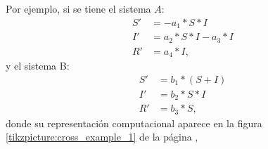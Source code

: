 Por ejemplo, si se tiene el sistema $A$:
\begin{align*}
    S' & = - a_1 * S * I         \\
    I' & = a_2 * S * I - a_3 * I \\
    R' & = a_4 * I,
\end{align*}
y el sistema B:
\begin{align*}
    S' & = b_1 * (S + I) \\
    I' & = b_2 * S * I   \\
    R' & = b_3 * S,
\end{align*}
donde su representación computacional aparece en la figura \ref{tikzpicture:cross_example_1} de la página \pageref{tikzpicture:cross_example_1},
\begin{center}




\end{center}
